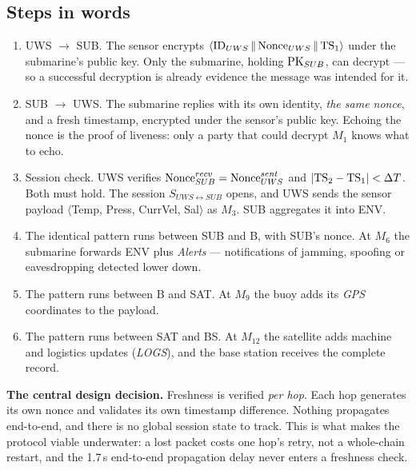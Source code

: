 \subsection{Steps in words}

\begin{enumerate}[label=\textbf{M\arabic*.},leftmargin=11mm]
\item UWS $\to$ SUB. The sensor encrypts $\langle \mathrm{ID}_{UWS} \,\|\, \mathrm{Nonce}_{UWS} \,\|\, \mathrm{TS}_1
      \rangle$ under the submarine's public key. Only the submarine, holding $\mathrm{PK}_{SUB}$,
      can decrypt --- so a successful decryption is already evidence the message was
      intended for it.
\item SUB $\to$ UWS. The submarine replies with its own identity, \emph{the same nonce}, and
      a fresh timestamp, encrypted under the sensor's public key. Echoing the nonce is the
      proof of liveness: only a party that could decrypt $M_1$ knows what to echo.
\item Session check. UWS verifies $\mathrm{Nonce}^{recv}_{SUB} = \mathrm{Nonce}^{sent}_{UWS}$ and
      $|\mathrm{TS}_2 - \mathrm{TS}_1| < \Delta T$. Both must hold. The session $S_{UWS \leftrightarrow SUB}$
      opens, and UWS sends the sensor payload
      $\langle$Temp, Press, CurrVel, Sal$\rangle$ as $M_3$. SUB aggregates it into ENV.
\item[\textbf{M4--M6.}] The identical pattern runs between SUB and B, with SUB's nonce. At
      $M_6$ the submarine forwards ENV plus \emph{Alerts} --- notifications of jamming,
      spoofing or eavesdropping detected lower down.
\item[\textbf{M7--M9.}] The pattern runs between B and SAT. At $M_9$ the buoy adds its
      \emph{GPS} coordinates to the payload.
\item[\textbf{M10--M12.}] The pattern runs between SAT and BS. At $M_{12}$ the satellite
      adds machine and logistics updates (\emph{LOGS}), and the base station receives the
      complete record.
\end{enumerate}

\begin{keybox}
\textbf{The central design decision.} Freshness is verified \emph{per hop}. Each hop
generates its own nonce and validates its own timestamp difference. Nothing propagates
end-to-end, and there is no global session state to track. This is what makes the protocol
viable underwater: a lost packet costs one hop's retry, not a whole-chain restart, and the
1.7\,s end-to-end propagation delay never enters a freshness check.
\end{keybox}

